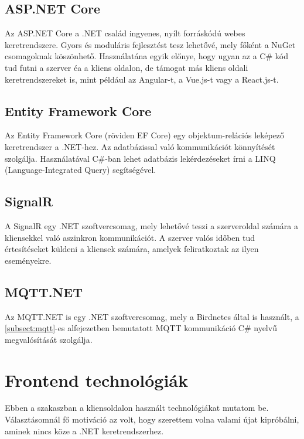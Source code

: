 \subsection{ASP.NET Core}
Az ASP.NET Core a .NET család ingyenes, nyílt forráskódú webes keretrendszere. Gyors és moduláris fejlesztést tesz lehetővé, mely főként a NuGet csomagoknak köszönhető.
Használatána egyik előnye, hogy ugyan az a C\# kód tud futni a szerver éa a kliens oldalon, de támogat más kliens oldali keretrendszereket is, mint például az Angular-t, a Vue.js-t
vagy a React.js-t.

\subsection{Entity Framework Core}
Az Entity Framework Core (röviden EF Core) egy objektum-relációs leképező keretrendszer a .NET-hez. Az adatbázissal való kommunikációt könnyítését szolgálja. 
Használatával C\#-ban lehet adatbázis lekérdezéseket írni a LINQ (Language-Integrated Query) segítségével.

\subsection{SignalR}
A SignalR egy .NET szoftvercsomag, mely lehetővé teszi a szerveroldal számára a kliensekkel való aszinkron kommunikációt.
A szerver valós időben tud értesítéseket küldeni a kliensek számára, amelyek feliratkoztak az ilyen eseményekre.

\subsection{MQTT.NET}
Az MQTT.NET is egy .NET szoftvercsomag, mely a Birdnetes által is használt, a \ref{subsect:mqtt}-es alfejezetben bemutatott MQTT kommunikáció C\# nyelvű megvalósítását szolgálja.

\section{Frontend technológiák}
Ebben a szakaszban a kliensoldalon használt technológiákat mutatom be. 
Választásomnál fő motiváció az volt, hogy szerettem volna valami újat kipróbálni, aminek nincs köze a .NET keretrendszerhez.

